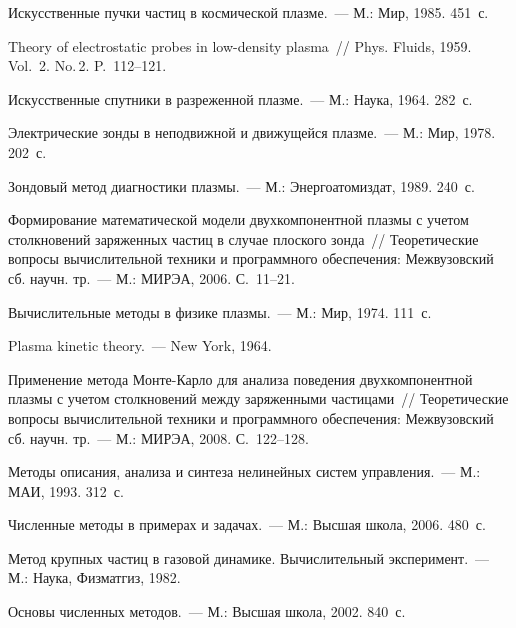 \begin{multicols}{2}
{{\begin{thebibliography}{99}
Искусственные пучки частиц в космической плазме.~--- М.: Мир, 1985.  451~с.

Theory of electrostatic probes in low-density plasma~// Phys. Fluids, 1959. Vol.~2. No.\,2. P.~112--121. 

Искусственные спутники в разреженной плазме.~--- М.: Наука, 1964.  282~с.

Электрические зонды в неподвижной и движущейся плазме.~--- М.: Мир, 1978.  202~с.

Зондовый метод диагностики плазмы.~--- М.: Энергоатомиздат, 1989.  240~с.

Формирование математической модели двухкомпонентной плазмы с учетом столкновений 
заряженных частиц в случае плоского зонда~// Теоретические вопросы вычислительной техники и 
программного обеспечения: Межвузовский сб. научн. тр.~--- М.: МИРЭА, 2006. С.~11--21.

Вычислительные методы в физике плазмы.~--- М.: Мир, 1974.  111~с.

Plasma kinetic theory.~--- New York, 1964. 

Применение метода Мон\-те-Кар\-ло для анализа поведения двухкомпонентной плазмы с учетом 
столкновений между заряженными частицами~// Теоретические вопросы\linebreak
вычислительной техники и 
программного обеспечения: Межвузовский сб. научн. тр.~--- М.: МИРЭА, 2008. С.~122--128. 

Методы описания, анализа и синтеза нелинейных систем управления.~--- М.: МАИ, 1993.  312~с.

Численные методы в примерах и задачах.~--- М.: Высшая школа, 2006.  480~с.

Метод крупных частиц в газовой динамике. Вычислительный эксперимент.~--- М.: Наука, 
Физматгиз, 1982.

\label{end\stat}

Основы численных методов.~--- М.: Высшая школа, 2002.  840~с.
 \end{thebibliography}
}
}


\end{multicols}       